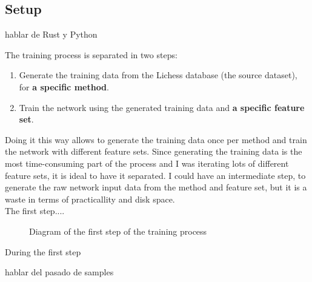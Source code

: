 \subsection{Setup}

hablar de Rust y Python

The training process is separated in two steps:

\begin{enumerate}
\item Generate the training data from the Lichess database (the source dataset), for \textbf{a specific method}.
\item Train the network using the generated training data and \textbf{a specific feature set}.
\end{enumerate}

Doing it this way allows to generate the training data once per method and train the network with different feature sets. Since generating the training data is the most time-consuming part of the process and I was iterating lots of different feature sets, it is ideal to have it separated. I could have an intermediate step, to generate the raw network input data from the method and feature set, but it is a waste in terms of practicallity and disk space. \\

The first step....

\begin{figure}[h]
\centering
{}
\caption{Diagram of the first step of the training process}
\end{figure}


During the first step


hablar del pasado de samples
